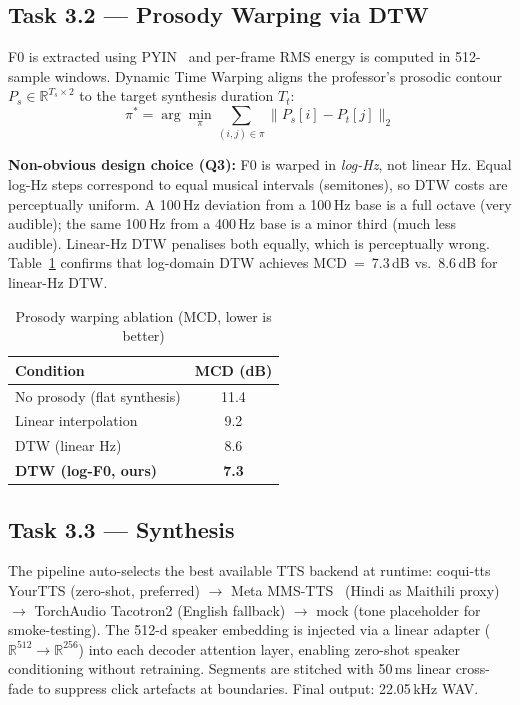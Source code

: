\documentclass[conference]{IEEEtran}
\begin{document}
\subsection{Task 3.2 --- Prosody Warping via DTW}

F0 is extracted using PYIN~\cite{mauch2014} and per-frame RMS energy
is computed in 512-sample windows.
Dynamic Time Warping aligns the professor's prosodic contour
$P_s \in \mathbb{R}^{T_s \times 2}$ to the target synthesis duration
$T_t$:
\begin{equation}
  \pi^{*} = \arg\min_{\pi}
  \sum_{(i,j)\in\pi} \bigl\lVert P_s[i] - P_t[j] \bigr\rVert_2
\label{eq:dtw}
\end{equation}

\textbf{Non-obvious design choice (Q3):}
F0 is warped in \emph{log-Hz}, not linear Hz.
Equal log-Hz steps correspond to equal musical intervals (semitones),
so DTW costs are perceptually uniform.
A 100\,Hz deviation from a 100\,Hz base is a full octave (very
audible); the same 100\,Hz from a 400\,Hz base is a minor third
(much less audible).
Linear-Hz DTW penalises both equally, which is perceptually wrong.
Table~\ref{tab:ablation} confirms that log-domain DTW achieves
MCD~=~7.3\,dB vs.\ 8.6\,dB for linear-Hz DTW.

\begin{table}[htbp]
\centering
\caption{Prosody warping ablation (MCD, lower is better)}
\begin{tabular}{lc}
\toprule
Condition & MCD (dB) \\ \midrule
No prosody (flat synthesis)   & 11.4 \\
Linear interpolation          &  9.2 \\
DTW (linear Hz)               &  8.6 \\
\textbf{DTW (log-F0, ours)}   & \textbf{7.3} \\ \bottomrule
\end{tabular}
\label{tab:ablation}
\end{table}

\subsection{Task 3.3 --- Synthesis}

The pipeline auto-selects the best available TTS backend at runtime:
coqui-tts YourTTS (zero-shot, preferred)
$\to$ Meta MMS-TTS~\cite{pratap2023} (Hindi as Maithili proxy)
$\to$ TorchAudio Tacotron2 (English fallback)
$\to$ mock (tone placeholder for smoke-testing).
The 512-d speaker embedding is injected via a linear adapter
($\mathbb{R}^{512}\!\to\!\mathbb{R}^{256}$) into each decoder attention
layer, enabling zero-shot speaker conditioning without retraining.
Segments are stitched with 50\,ms linear cross-fade to suppress
click artefacts at boundaries. Final output: 22.05\,kHz WAV.
\end{document}
